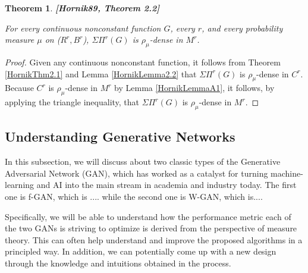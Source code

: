 \documentclass[12pt]{amsart}
\theoremstyle{plain}
\newtheorem{thm}{Theorem}[section]
\theoremstyle{definition}
\theoremstyle{remark}
\numberwithin{equation}{section}
\numberwithin{thm}{section}
\begin{document}
\begin{thm}
\textbf{[Hornik89, Theorem 2.2]}

For every continuous nonconstant function $G$, every $r$, and every probability measure $\mu$ on ($R^{r},B^{r}$), $\Sigma\Pi^{r}(G)$ is $\rho_{\mu}$-dense in $M^{r}$.
 
\end{thm}
\begin{proof} %
    Given any continuous nonconstant function, it follows from Theorem \ref{HornikThm2.1} and Lemma \ref{HornikLemma2.2} that $\Sigma\Pi^r(G)$ is $\rho_\mu$-dense in $C^r$. Because $C^r$ is $\rho_\mu$-dense in $M^r$ by Lemma \ref{HornikLemmaA1}, it follows, by applying the triangle inequality, that $\Sigma\Pi^r(G)$ is $\rho_\mu$-dense in $M^r$.  
\end{proof}



\subsection{\textbf{Understanding Generative Networks}}\label{sec:GenerativeModels}

In this subsection, we will discuss about two classic types of the Generative Adversarial Network (GAN), which has worked as a catalyst for turning machine-learning and AI into the main stream in academia and industry today. 
The first one is f-GAN, which is .... while the second one is W-GAN, which is....

Specifically, we will be able to understand how the performance metric each of the two GANs is striving to optimize is derived from the perspective of measure theory. This can often help understand and improve the proposed algorithms in a principled way. In addition, we can potentially come up with a new design through the knowledge and intuitions obtained in the process.

\end{document}
